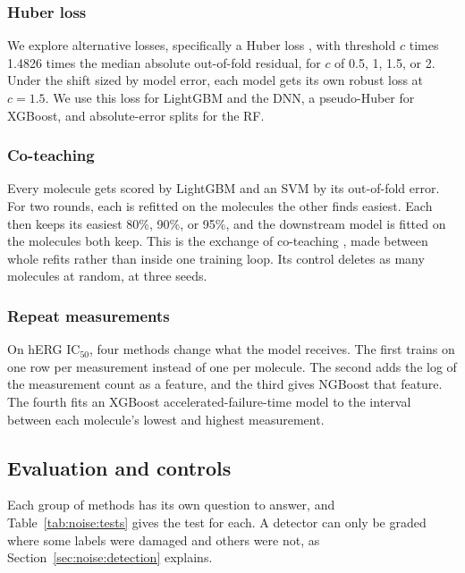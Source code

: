 \subsubsection{Huber loss}

We explore alternative losses, specifically a Huber loss \citep{Huber1964}, with threshold $c$ times 1.4826 times the median absolute out-of-fold residual, for $c$ of 0.5, 1, 1.5, or 2. Under the shift sized by model error, each model gets its own robust loss at $c = 1.5$. We use this loss for LightGBM and the DNN, a pseudo-Huber for XGBoost, and absolute-error splits for the RF.

\subsubsection{Co-teaching}
Every molecule gets scored by LightGBM and an SVM by its out-of-fold error. For two rounds, each is refitted on the molecules the other finds easiest. Each then keeps its easiest 80\%, 90\%, or 95\%, and the downstream model is fitted on the molecules both keep. This is the exchange of co-teaching \citep{Han2018}, made between whole refits rather than inside one training loop. Its control deletes as many molecules at random, at three seeds.

\subsubsection{Repeat measurements}
On hERG IC$_{50}$, four methods change what the model receives. The first trains on one row per measurement instead of one per molecule. The second adds the log of the measurement count as a feature, and the third gives NGBoost that feature. The fourth fits an XGBoost accelerated-failure-time model \citep{Barnwal2022} to the interval between each molecule's lowest and highest measurement.

\subsection{Evaluation and controls}\label{sec:noise:tests}

Each group of methods has its own question to answer, and Table~\ref{tab:noise:tests} gives the test for each. A detector can only be graded where some labels were damaged and others were not, as Section~\ref{sec:noise:detection} explains.

